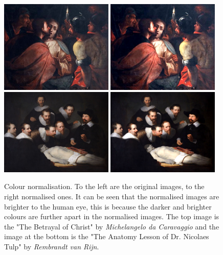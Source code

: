 \documentclass[11pt,a4paper,twoside,openright]{report}
\begin{document}
\begin{figure}[tbp]
\centering
\includegraphics[width=0.48\textwidth]{nirp_caravaggio_1962_139_1}
\includegraphics[width=0.48\textwidth]{caravaggio_1962_139_1}
\includegraphics[width=0.48\textwidth]{nirp_rembrandt_eu_464}
\includegraphics[width=0.48\textwidth]{rembrandt_eu_464}
\caption[Colour normalisation]{Colour normalisation.  To the left are the
original images, to the right normalised ones.  It can be seen that the
normalised images are brighter to the human eye, this is because the darker and
brighter colours are further apart in the normalised images.  The top image is
the "The Betrayal of Christ" by \emph{Michelangelo da Caravaggio} and the image
at the bottom is the "The Anatomy Lesson of Dr. Nicolaes Tulp" by
\emph{Rembrandt van Rijn}.}
\label{fig:norm}
\end{figure}
\end{document}
